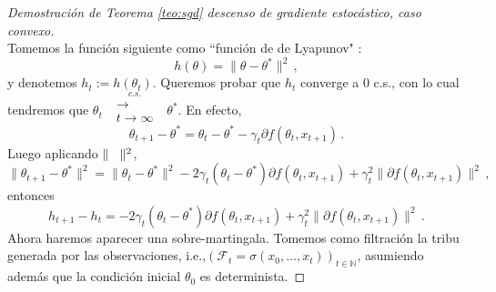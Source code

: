 \documentclass[letterpaper,11pt]{article} %
\def\espacio{\hspace{.25cm}\,}
\theoremstyle{defbreak}
\theoremstyle{propbreak}
\theoremstyle{remark}
\theoremstyle{break}
\def\N{\mathbb{N}}
\def\gris{\color{mygray}}
\begin{document}
\begin{proof}[Demostración de Teorema \ref{teo:sgd} descenso de gradiente estocástico, caso convexo]
\gris \\ Tomemos la función  siguiente como “funci\'on de de Lyapunov" :
$$ h(\theta) = \|\theta-\theta^*\|^2\, , $$
y denotemos $h_t:=h(\theta_t)$. Queremos probar que $h_t$ converge a $0$ c.s., con lo cual tendremos que $\theta_t\mbox{ }\overset{c.s.}{\substack{\longrightarrow \\t \to \infty}}\mbox{ }\theta^*$. En efecto,
$$ \theta_{t+1}-\theta^* = \theta_t-\theta^*-\gamma_t\partial f(\theta_t,x_{t+1}) \,.$$
Luego aplicando $\|\espacio\|^2$,
$$ \|\theta_{t+1}-\theta^*\|^2 = \|\theta_t-\theta^*\|^2-2\gamma_t(\theta_t-\theta^*)\partial f(\theta_{t},x_{t+1})+\gamma^2_t\|\partial f(\theta_t,x_{t+1})\|^2 \,,$$
entonces
$$ h_{t+1}-h_t = -2\gamma_t(\theta_t-\theta^*)\partial f(\theta_t,x_{t+1})+\gamma_t^2\|\partial f(\theta_t,x_{t+1})\|^2 \, .$$
Ahora haremos aparecer una sobre-martingala. Tomemos como filtración la tribu generada por las observaciones, i.e.,$ (\mathcal{F}_t=\sigma(x_0,\dots,x_t))_{t\in\N}$, asumiendo adem\'as que la condici\'on inicial $\theta_0$ es determinista. 


\end{proof}
\end{document}
